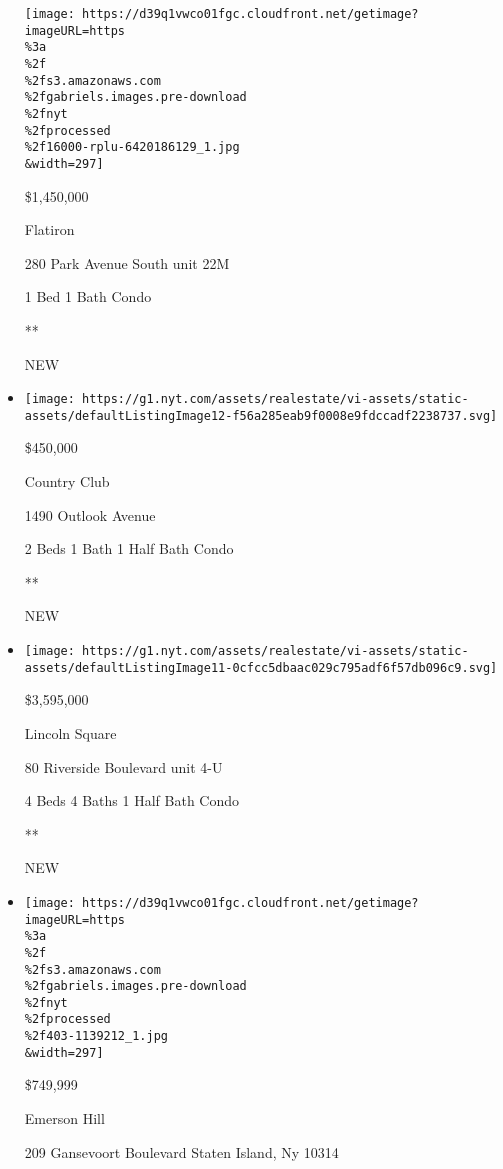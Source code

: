 \begin{itemize}
  \texttt{[image: https://d39q1vwco01fgc.cloudfront.net/getimage?imageURL=https\\\%3a\\\%2f\\\%2fs3.amazonaws.com\\\%2fgabriels.images.pre-download\\\%2fnyt\\\%2fprocessed\\\%2f16000-rplu-6420186129\_1.jpg\\\&width=297]}

  \$1,450,000

  Flatiron

  280 Park Avenue South unit 22M

  1 Bed \textbar{} 1 Bath \textbar{} Condo

  **

  NEW
\item
  \href{/real-estate/usa/ny/bronx/country-club/homes-for-sale/1490-outlook-avenue/185-20292414?}{}

  \texttt{[image: https://g1.nyt.com/assets/realestate/vi-assets/static-assets/defaultListingImage12-f56a285eab9f0008e9fdccadf2238737.svg]}

  \$450,000

  Country Club

  1490 Outlook Avenue

  2 Beds \textbar{} 1 Bath \textbar{} 1 Half Bath \textbar{} Condo

  **

  NEW
\item
  \href{/real-estate/usa/ny/new-york/lincoln-square/homes-for-sale/80-riverside-boulevard/12436-OLRS-358644?}{}

  \texttt{[image: https://g1.nyt.com/assets/realestate/vi-assets/static-assets/defaultListingImage11-0cfcc5dbaac029c795adf6f57db096c9.svg]}

  \$3,595,000

  Lincoln Square

  80 Riverside Boulevard unit 4-U

  4 Beds \textbar{} 4 Baths \textbar{} 1 Half Bath \textbar{} Condo

  **

  NEW
\item
  \href{/real-estate/usa/ny/staten-island/emerson-hill/homes-for-sale/209-gansevoort-boulevard-staten-island-ny-10314/403-1139212?}{}

  \texttt{[image: https://d39q1vwco01fgc.cloudfront.net/getimage?imageURL=https\\\%3a\\\%2f\\\%2fs3.amazonaws.com\\\%2fgabriels.images.pre-download\\\%2fnyt\\\%2fprocessed\\\%2f403-1139212\_1.jpg\\\&width=297]}

  \$749,999

  Emerson Hill

  209 Gansevoort Boulevard Staten Island, Ny 10314


\end{itemize}
